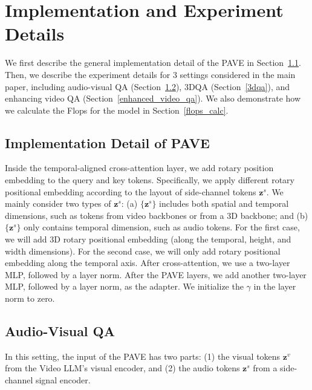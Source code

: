 \section{Implementation and Experiment Details} \label{implementation}
We first describe the general implementation detail of the PAVE in Section~\ref{pave_inple}. Then, we describe the experiment details for 3 settings considered in the main paper, including audio-visual QA (Section~\ref{avqa}), 3DQA (Section~\ref{3dqa}), and enhancing video QA (Section~\ref{enhanced_video_qa}). We also demonstrate how we calculate the Flops for the model in Section~\ref{flops_calc}.

\subsection{Implementation Detail of PAVE} \label{pave_inple}


Inside the temporal-aligned cross-attention layer, we add rotary position embedding to the query and key tokens. Specifically, we apply different rotary positional embedding according to the layout of side-channel tokens $\mathbf{z}^s$. We mainly consider two types of $\mathbf{z}^s$: (a) $\{\mathbf{z}^s\}$ includes both spatial and temporal dimensions, such as tokens from video backbones or from a 3D backbone; and (b) $\{\mathbf{z}^s\}$ only contains temporal dimension, such as audio tokens. For the first case, we will add 3D rotary positional embedding (along the temporal, height, and width dimensions). For the second case, we will only add rotary positional embedding along the temporal axis. After cross-attention, we use a two-layer MLP, followed by a layer norm. 
After the PAVE layers, we add another two-layer MLP, followed by a layer norm, as the adapter. We initialize the $\gamma$ in the layer norm to zero. 








\subsection{Audio-Visual QA}\label{avqa}
In this setting, the input of the PAVE has two parts: (1) the visual tokens $\mathbf{z}^v$ from the Video LLM's visual encoder, and (2) the audio tokens $\mathbf{z}^s$ from a side-channel signal encoder.

